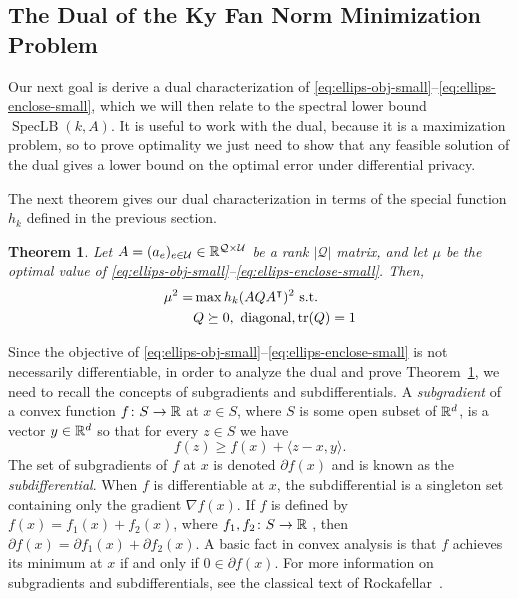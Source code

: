 \documentclass{article}
\newtheorem{theorem}{Theorem}[section]
\def\tr{{\rm tr}} \def\rank{{\rm rank}}
\newcommand{\univ}{U}
\newcommand{\maps}{\colon} \DeclareMathOperator{\disc}{disc}
\DeclareMathOperator{\specLB}{SpecLB}
\newcommand{\tra}{\intercal}
\renewcommand{\univ}{\mathcal{U}}
\newcommand{\quer}{\mathcal{Q}}
\begin{document}
\subsection{The Dual of the Ky Fan Norm Minimization Problem}

Our next goal is derive a dual characterization of
\eqref{eq:ellips-obj-small}--\eqref{eq:ellips-enclose-small}, which we
will then relate to the spectral lower bound $\specLB(k, A)$. It is
useful to work with the dual, because it is a maximization problem, so
to prove optimality we just need to show that any feasible solution of
the dual gives a lower bound on the optimal error under differential
privacy.


The next theorem gives our dual characterization in terms of the
special function $h_k$ defined in the previous section.

\begin{theorem}\label{thm:nuclear-small}
  Let $A = (a_e)_{e \in \univ}\in \R^{\quer\times \univ}$ be a rank
  $|\quer|$ matrix, and let $\mu$ be the optimal value of
  \eqref{eq:ellips-obj-small}--\eqref{eq:ellips-enclose-small}. Then,
  \begin{align}
    \mu^2 =   &\max h_k(AQA^\tra)^2\label{eq:nuclear-obj2-small}\text{ s.t.}\\
    &Q \succeq 0, \text{ diagonal},\tr(Q) = 1\label{eq:nuclear-pos2-small}
  \end{align}
\end{theorem}

Since the objective of
\eqref{eq:ellips-obj-small}--\eqref{eq:ellips-enclose-small} is not
necessarily differentiable, in order to analyze the dual and prove
Theorem~\ref{thm:nuclear-small}, we need to recall the concepts of
subgradients and subdifferentials. A \emph{subgradient} of a convex
function $f\maps S \to \R$ at $x \in S$, where $S$ is some open subset
of ${\mathbb{R}}^d$, is a vector $y \in {\mathbb{R}}^d$ so that for every $z \in S$ we
have
\[
f(z) \geq f(x) + \langle z-x, y\rangle.
\]
The set of subgradients of $f$ at $x$ is denoted $\partial{f(x)}$ and
is known as the \emph{subdifferential}. When $f$ is differentiable at
$x$, the subdifferential is a singleton set containing only the
gradient $\nabla f(x)$. If $f$ is defined by $f(x) = f_1(x) + f_2(x)$,
where $f_1, f_2\maps S \to \R$ , then $\partial f(x) = \partial f_1(x)
+ \partial f_2(x)$. A basic fact in convex analysis is that $f$
achieves its minimum at  $x$ if and only if $0 \in \partial f(x)$. For
more information on subgradients and subdifferentials, see the
classical text of Rockafellar~\cite{Rockafellar}. 
\end{document}

